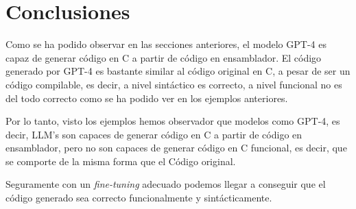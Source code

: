 \section{Conclusiones}
\label{sec:conclusiones}

Como se ha podido observar en las secciones anteriores, el modelo GPT-4 es capaz de generar
código en C a partir de código en ensamblador. El código generado por GPT-4 es bastante
similar al código original en C, a pesar de ser un código compilable, es decir, a nivel
sintáctico es correcto, a nivel funcional no es del todo correcto como se ha podido
ver en los ejemplos anteriores.

Por lo tanto, visto los ejemplos hemos observador que modelos como GPT-4, es decir, LLM's
son capaces de generar código en C a partir de código en ensamblador, pero no son capaces
de generar código en C funcional, es decir, que se comporte de la misma forma que el Código
original.

Seguramente con un \textit{fine-tuning} adecuado podemos llegar a conseguir que el código generado
sea correcto funcionalmente y sintácticamente.